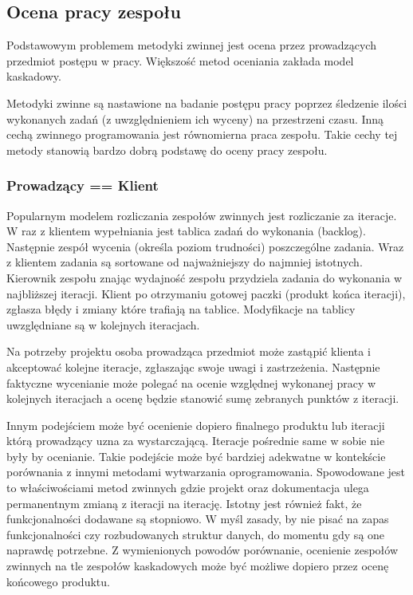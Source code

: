 \subsection{Ocena pracy zespołu}

Podstawowym problemem metodyki zwinnej jest ocena przez prowadzących przedmiot postępu w pracy. Większość metod oceniania zakłada model kaskadowy. 

Metodyki zwinne są nastawione na badanie postępu pracy poprzez śledzenie ilości wykonanych zadań (z uwzględnieniem ich wyceny) na przestrzeni czasu. Inną cechą zwinnego programowania jest równomierna praca zespołu. Takie cechy tej metody stanowią bardzo dobrą podstawę do oceny pracy zespołu. 

\subsubsection{Prowadzący == Klient}

Popularnym modelem rozliczania zespołów zwinnych jest rozliczanie za iteracje. W raz z klientem wypełniania jest tablica zadań do wykonania (backlog). Następnie zespół wycenia (określa poziom trudności) poszczególne zadania. Wraz z klientem zadania są sortowane od najważniejszy do najmniej istotnych. Kierownik zespołu znając wydajność zespołu przydziela zadania do wykonania w najbliższej iteracji. Klient po otrzymaniu gotowej paczki (produkt końca iteracji), zgłasza błędy i zmiany które trafiają na tablice. Modyfikacje na tablicy uwzględniane są w kolejnych iteracjach.

Na potrzeby projektu osoba prowadząca przedmiot może zastąpić klienta i akceptować kolejne iteracje, zgłaszając swoje uwagi i zastrzeżenia. Następnie faktyczne wycenianie może polegać na ocenie względnej wykonanej pracy w kolejnych iteracjach a ocenę będzie stanowić sumę zebranych punktów z iteracji. 

Innym podejściem może być ocenienie dopiero finalnego produktu lub iteracji którą prowadzący uzna za wystarczającą. Iteracje pośrednie same w sobie nie były by ocenianie. Takie podejście może być bardziej adekwatne w kontekście porównania z innymi metodami wytwarzania oprogramowania. Spowodowane jest to właściwościami metod zwinnych gdzie projekt oraz dokumentacja ulega permanentnym zmianą z iteracji na iterację. Istotny jest również fakt, że funkcjonalności dodawane są stopniowo. W myśl zasady, by nie pisać na zapas funkcjonalności czy rozbudowanych struktur danych, do momentu gdy są one naprawdę potrzebne. Z wymienionych powodów porównanie, ocenienie zespołów zwinnych na tle zespołów kaskadowych może być możliwe dopiero przez ocenę końcowego produktu. 






